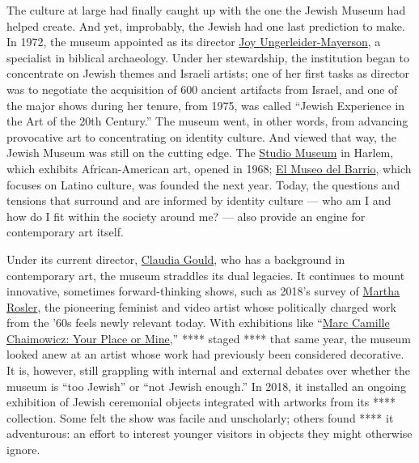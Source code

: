The culture at large had finally caught up with the one the Jewish
Museum had helped create. And yet, improbably, the Jewish had one last
prediction to make. In 1972, the museum appointed as its director
\href{https://www.nytimes3xbfgragh.onion/1994/09/09/obituaries/joy-ungerleider-mayerson-74-former-head-of-jewish-museum.html}{Joy
Ungerleider-Mayerson}, a specialist in biblical archaeology. Under her
stewardship, the institution began to concentrate on Jewish themes and
Israeli artists; one of her first tasks as director was to negotiate the
acquisition of 600 ancient artifacts from Israel, and one of the major
shows during her tenure, from 1975, was called ``Jewish Experience in
the Art of the 20th Century.'' The museum went, in other words, from
advancing provocative art to concentrating on identity culture. And
viewed that way, the Jewish Museum was still on the cutting edge. The
\href{https://studiomuseum.org/}{Studio Museum} in Harlem, which
exhibits African-American art, opened in 1968;
\href{https://www.elmuseo.org/}{El Museo del Barrio}, which focuses on
Latino culture, was founded the next year. Today, the questions and
tensions that surround and are informed by identity culture --- who am I
and how do I fit within the society around me? --- also provide an
engine for contemporary art itself.

Under its current director,
\href{https://www.nytimes3xbfgragh.onion/2019/02/21/t-magazine/jane-mayle-claudia-gould.html}{Claudia
Gould}, who has a background in contemporary art, the museum straddles
its dual legacies. It continues to mount innovative, sometimes
forward-thinking shows, such as 2018's survey of
\href{https://www.nytimes3xbfgragh.onion/2019/02/14/t-magazine/martha-rosler.html}{Martha
Rosler}, the pioneering feminist and video artist whose politically
charged work from the '60s feels newly relevant today. With exhibitions
like
``\href{https://www.nytimes3xbfgragh.onion/2018/03/15/t-magazine/marc-camille-chaimowicz.html}{Marc
Camille Chaimowicz: Your Place or Mine},'' **** staged **** that same
year, the museum looked anew at an artist whose work had previously been
considered decorative. It is, however, still grappling with internal and
external debates over whether the museum is ``too Jewish'' or ``not
Jewish enough.'' In 2018, it installed an ongoing exhibition of Jewish
ceremonial objects integrated with artworks from its **** collection.
Some felt the show was facile and unscholarly; others found **** it
adventurous: an effort to interest younger visitors in objects they
might otherwise ignore.

